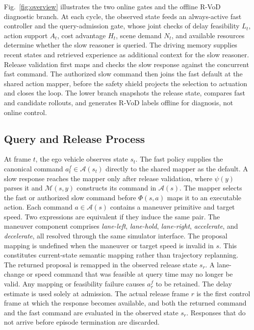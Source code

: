 \documentclass[letterpaper,journal]{IEEEtran}
\begin{document}
Fig.~\ref{fig:overview} illustrates the two online gates and the offline R-VoD
diagnostic branch. At each cycle, the observed state feeds an always-active fast
controller and the query-admission gate, whose joint checks of delay feasibility
$L_t$, action support $A_t$, cost advantage $H_t$, scene demand $N_t$, and
available resources determine whether the slow reasoner is queried. The driving
memory supplies recent states and retrieved experience as additional context for
the slow reasoner. Release validation first maps and checks the slow response
against the concurrent fast command. The authorized slow command then joins the
fast default at the shared action mapper, before the safety shield projects the
selection to actuation and closes the loop. The
lower branch snapshots the release
state, compares fast and candidate rollouts, and generates R-VoD labels offline
for diagnosis, not online control.
\subsection{Query and Release Process}
At frame $t$, the ego vehicle observes state $s_t$. The fast policy supplies
the canonical command $a_t^f\in\mathcal A(s_t)$ directly to the shared mapper
as the default. A slow response reaches the mapper only after release validation,
where $\psi(y)$ parses it and $\mathcal M(s,y)$ constructs its command in
$\mathcal A(s)$. The mapper selects the fast or authorized slow command before
$\Phi(s,a)$ maps it to an executable action. Each command $a\in\mathcal A(s)$
contains a maneuver primitive and target speed. Two expressions are equivalent
if they induce the same pair. The maneuver component comprises
\textit{lane-left}, \textit{lane-hold}, \textit{lane-right}, \textit{accelerate},
and \textit{decelerate}, all resolved through the same simulator interface.
The proposal mapping is undefined when the maneuver or target speed is invalid
in $s$. This constitutes current-state semantic mapping rather than trajectory
replanning.
The returned proposal is remapped in the observed release state $s_r$. A
lane-change or speed command that was feasible at query time may no longer be
valid. Any mapping or feasibility failure causes $a_r^f$ to be retained.
The delay estimate is used solely at admission. The actual release frame $r$ is
the first control frame at which the response becomes available, and both the
returned command and the fast command are evaluated in the observed state $s_r$.
Responses that do not arrive before episode termination are discarded.
\end{document}
